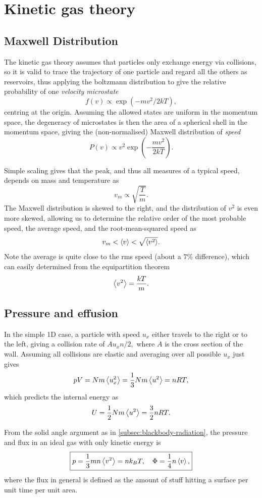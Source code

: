 \documentclass{article}
\theoremstyle{nonumberplain}
\begin{document}
\section{Kinetic gas theory}
\subsection{Maxwell Distribution}
The kinetic gas theory assumes that particles only exchange energy via collisions, so it is valid to trace the trajectory of one particle and regard all the others as reservoirs, thus applying the boltzmann distribution to give the relative probability of one \textit{velocity microstate} 
\[
    f(v) \propto \exp(- m v^{2} / 2 k T), 
\]
centring at the origin. Assuming the allowed states are uniform in the momentum space, the degeneracy of microstates is then the area of a spherical shell in the momentum space, giving the (non-normalised) Maxwell distribution of \textit{speed}
\[
    \boxed{P(v) \propto v^2 \exp\left(- \frac{mv^{2} }{2 k T}\right).}
\]

Simple scaling gives that the peak, and thus all measures of a typical speed, depends on mass and temperature as
\[
    v_m \propto \sqrt{\frac{T}{m}}.  
\]
The Maxwell distribution is skewed to the right, and the distribution of $v^2$ is even more skewed, allowing us to determine the relative order of the most probable speed, the average speed, and the root-mean-squared speed as 
\[
    v_m < \expval{v} < \sqrt{\expval{v^2}}. 
\]
Note the average is quite close to the rms speed (about a $7\%$ difference), which can easily determined from the equipartition theorem
\[
    \expval{v^{2} } = \frac{k T }{m}. 
\]

\subsection{Pressure and effusion}
In the simple 1D case, a particle with speed $u_x$ either travels to the right or to the left, giving a collision rate of $A u_x n /2,$ where $A$ is the cross section of the wall. Assuming all collisions are elastic and averaging over all possible $u_x$ just gives
\[
    pV = N m \expval{u_x^2} = \frac{1}{3} N m \expval{u^2} = n R T,
\]
which predicts the internal energy as 
\[
    U =\frac{1}{2}N m \expval{u^2} = \frac{3}{2} n R T.
\]

From the solid angle argument as in \ref{subsec:blackbody-radiation}, the pressure and flux in an ideal gas with only kinetic energy is
\[
    \boxed{p = \frac{1}{3}m n \expval{v^{2}} = n k_B T, \quad 
    \Phi = \frac{1}{4}n \expval{v}, }
\]
where the flux in general is defined as the amount of stuff hitting a surface per unit time per unit area. 
\end{document}

